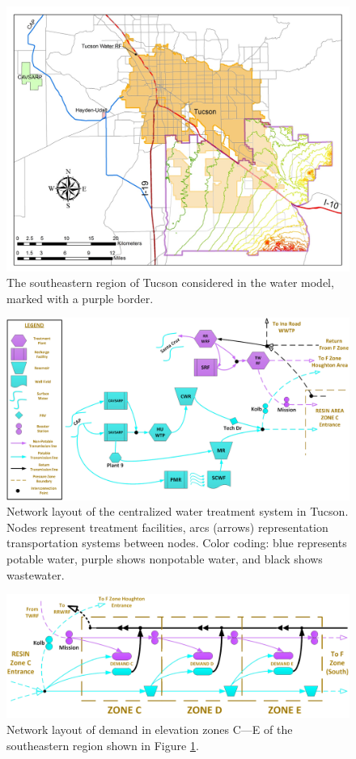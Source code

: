 \documentclass[12pt]{amsart}
\begin{document}
\begin{figure}[!ht]
	\centering
	\includegraphics[width=.7\textwidth]{images/tucson_elevation}
	\caption{
		The southeastern region of Tucson considered in the water model, marked with a purple border.
	}
	\label{fig:tucson_map}
\end{figure}

\begin{figure}[!ht]
	\centering
	\includegraphics[width=.8\textwidth]{images/nodes_central}
	\caption{
		Network layout of the centralized water treatment system in Tucson.
		Nodes represent treatment facilities, arcs (arrows) representation transportation systems between nodes.
		Color coding: blue represents potable water, purple shows nonpotable water, and black shows wastewater.
	}
	\label{fig:nodes_central}
\end{figure}

\begin{figure}[!ht]
	\centering
	\includegraphics[width=.8\textwidth]{images/zones_c_e}
	\caption{
		Network layout of demand in elevation zones C---E of the southeastern region shown in Figure \ref{fig:tucson_map}.
	}
	\label{fig:zones_c_e}
\end{figure}
\end{document}
